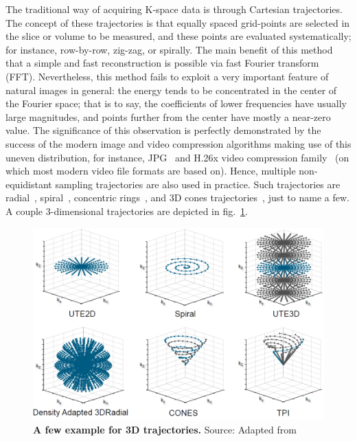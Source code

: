 The traditional way of acquiring K-space data is through Cartesian trajectories. The concept of these trajectories is that equally spaced grid-points are selected in the slice or volume to be measured, and these points are evaluated systematically; for instance, row-by-row, zig-zag, or spirally. The main benefit of this method that a simple and fast reconstruction is possible via fast Fourier transform (FFT). Nevertheless, this method fails to exploit a very important feature of natural images in general: the energy tends to be concentrated in the center of the Fourier space; that is to say, the coefficients of lower frequencies have usually large magnitudes, and points further from the center have mostly a near-zero value. The significance of this observation is perfectly demonstrated by the success of the modern image and video compression algorithms making use of this uneven distribution, for instance, JPG~\cite{wallace_jpeg_1992} and H.26x video compression family~\cite{farooq_study_2017} (on which most modern video file formats are based on). Hence, multiple non-equidistant sampling trajectories are also used in practice. Such trajectories are radial~\cite{rasche_continuous_1995}, spiral~\cite{blum_fast_1987}, concentric rings~\cite{wu_mri_2008}, and 3D cones trajectories~\cite{gurney_design_2006}, just to name a few. A couple 3-dimensional trajectories are depicted in fig.~\ref{fig:trajectories}.

\begin{figure}[tb]
    \centering
    \includegraphics[width=0.8\linewidth]{images/trajectories.png}
    \caption{\textbf{A few example for 3D trajectories.} Source: Adapted from~\cite{noauthor_forschungszentrum_nodate}}
    \label{fig:trajectories}
\end{figure}

